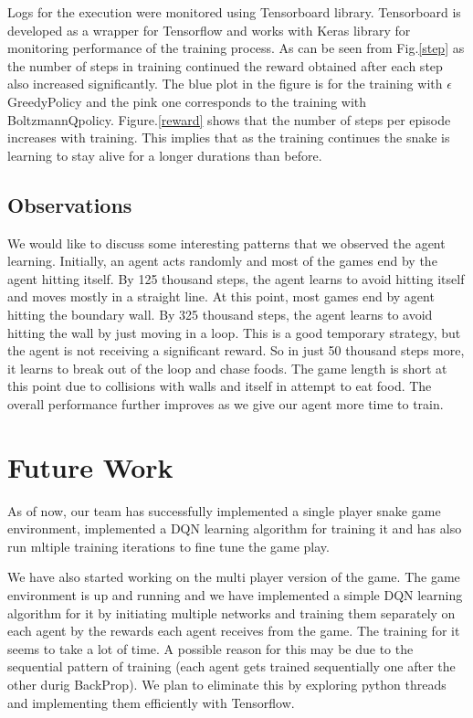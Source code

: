 \documentclass[conference,10pt]{IEEEtran}
\begin{document}
	Logs for the execution were monitored using Tensorboard library. Tensorboard is developed as a wrapper for Tensorflow and works with Keras library for monitoring performance of the training process.
	\break
	\break
	As can be seen from Fig.\ref{step} as the number of steps in training continued the reward obtained after each step also increased significantly. The blue plot in the figure is for the training with \(\epsilon\)GreedyPolicy and the pink one corresponds to the training with BoltzmannQpolicy.
	\break
	\break
	Figure.\ref{reward} shows that the number of steps per episode increases with training. This implies that as the training continues the snake is learning to stay alive for a longer durations than before.

	\subsection{Observations}
	We would like to discuss some interesting patterns that we observed the agent learning. Initially, an agent acts randomly and most of the games end by the agent hitting itself. By 125 thousand steps, the agent learns to avoid hitting itself and moves mostly in a straight line. At this point, most games end by agent hitting the boundary wall. By 325 thousand steps,  the agent learns to avoid hitting the wall by just moving in a loop. This is a good temporary strategy, but the agent is not receiving a significant reward. So in just 50 thousand steps more, it learns to break out of the loop and chase foods. The game length is short at this point due to collisions with walls and itself in attempt to eat food. The overall performance further improves as we give our agent more time to train.

\section{Future Work}
As of now, our team has successfully implemented a single player snake game environment, implemented a DQN learning algorithm for training it and has also run mltiple training iterations to fine tune the game play.
\break
\break

We have also started working on the multi player version of the game. The game environment is up and running and we have implemented a simple DQN learning algorithm for it by initiating multiple networks and training them separately on each agent by the rewards each agent receives from the game.
The training for it seems to take a lot of time. A possible reason for this may be due to the sequential pattern of training (each agent gets trained sequentially one after the other durig BackProp). We plan to eliminate this by exploring python threads and implementing them efficiently with Tensorflow.
\break
\break
\end{document}
